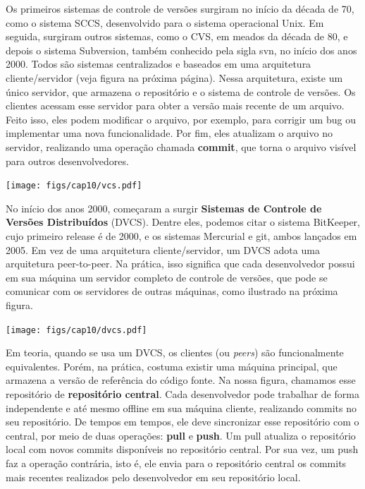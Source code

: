 \documentclass[
  11pt,
  twoside]{book}
\let\origfigure\figure
\let\endorigfigure\endfigure
\renewenvironment{figure}[1][2] {
    \expandafter\origfigure\expandafter[!h]
} {
    \endorigfigure
}
\begin{document}
  
 Os primeiros
sistemas de controle de versões surgiram no início da década de 70, como
o sistema SCCS, desenvolvido para o sistema operacional Unix. Em
seguida, surgiram outros sistemas, como o CVS, em meados da década de
80, e depois o sistema Subversion, também conhecido pela sigla svn, no
início dos anos 2000. Todos são sistemas centralizados e baseados em uma
arquitetura cliente/servidor (veja figura na próxima página). Nessa
arquitetura, existe um único servidor, que armazena o repositório e o
sistema de controle de versões. Os clientes acessam esse servidor para
obter a versão mais recente de um arquivo. Feito isso, eles podem
modificar o arquivo, por exemplo, para corrigir um bug ou implementar
uma nova funcionalidade. Por fim, eles atualizam o arquivo no servidor,
realizando uma operação chamada \textbf{commit}, que torna o arquivo
visível para outros desenvolvedores.

\begin{figure}
\centering
\texttt{[image: figs/cap10/vcs.pdf]}
\caption{VCS Centralizado. Existe um único repositório, no nodo
servidor.}
\end{figure}

 
No início dos anos 2000, começaram a surgir \textbf{Sistemas de Controle
de Versões Distribuídos} (DVCS). Dentre eles, podemos citar o sistema
BitKeeper, cujo primeiro release é de 2000, e os sistemas Mercurial e
git, ambos lançados em 2005. Em vez de uma arquitetura cliente/servidor,
um DVCS adota uma arquitetura peer-to-peer. Na prática, isso significa
que cada desenvolvedor possui em sua máquina um servidor completo de
controle de versões, que pode se comunicar com os servidores de outras
máquinas, como ilustrado na próxima figura.

\begin{figure}
\centering
\texttt{[image: figs/cap10/dvcs.pdf]}
\caption{VCS Distribuído (DVCS). Cada cliente possui um servidor. Logo,
a arquitetura é peer-to-peer.}
\end{figure}

Em teoria, quando se usa um DVCS, os clientes (ou \emph{peers}) são
funcionalmente equivalentes. Porém, na prática, costuma existir uma
máquina principal, que armazena a versão de referência do código fonte.
Na nossa figura, chamamos esse repositório de \textbf{repositório
central}. Cada desenvolvedor pode trabalhar de forma independente e até
mesmo offline em sua máquina cliente, realizando commits no seu
repositório. De tempos em tempos, ele deve sincronizar esse repositório
com o central, por meio de duas operações: \textbf{pull} e
\textbf{push}. Um pull atualiza o repositório local com novos commits
disponíveis no repositório central. Por sua vez, um push faz a operação
contrária, isto é, ele envia para o repositório central os commits mais
recentes realizados pelo desenvolvedor em seu repositório local.
\end{document}
